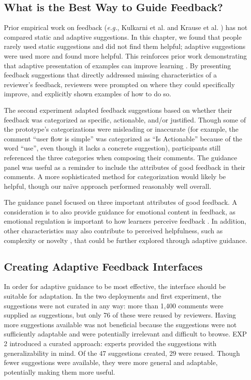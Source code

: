 \subsection{What is the Best Way to Guide Feedback?}
Prior empirical work on feedback (\textit{e.g.}, Kulkarni et al. \cite{Kulkarni2013} and Krause et al. \cite{Krause2017}) has not compared static and adaptive suggestions. In this chapter, we found that people rarely used static suggestions and did not find them helpful; adaptive suggestions were used more and found more helpful. This reinforces prior work demonstrating that adaptive presentation of examples can improve learning \cite{Lee2010, Najar2014}. By presenting feedback suggestions that directly addressed missing characteristics of a reviewer's feedback, reviewers were prompted on where they could specifically improve, and explicitly shown examples of how to do so. 

The second experiment adapted feedback suggestions based on whether their feedback was categorized as specific, actionable, and/or justified. Though some of the prototype's categorizations were misleading or inaccurate (for example, the comment ``user flow is simple'' was categorized as ``Is Actionable'' because of the word ``use'', even though it lacks a concrete suggestion), participants still referenced the three categories when composing their comments. The guidance panel was useful as a reminder to include the attributes of good feedback in their comments. A more sophisticated method for categorization would likely be helpful, though our naïve approach performed reasonably well overall.

The guidance panel focused on three important attributes of good feedback. A consideration is to also provide guidance for emotional content in feedback, as emotional regulation is important to how learners perceive feedback \cite{Krause2017, Varlander2008}. In addition, other characteristics may also contribute to perceived helpfulness, such as complexity or novelty \cite{Krause2017}, that could be further explored through adaptive guidance.

\subsection{Creating Adaptive Feedback Interfaces}
In order for adaptive guidance to be most effective, the interface should be suitable for adaptation. In the two deployments and first experiment, the suggestions were not curated in any way: more than 1,400 comments were supplied as suggestions, but only 76 of these were reused by reviewers. Having more suggestions available was not beneficial because the suggestions were not sufficiently adaptable and were potentially irrelevant and difficult to browse. EXP 2 introduced a curated approach: experts provided the suggestions with generalizability in mind. Of the 47 suggestions created, 29 were reused. Though fewer suggestions were available, they were more general and adaptable, potentially making them more useful. 


